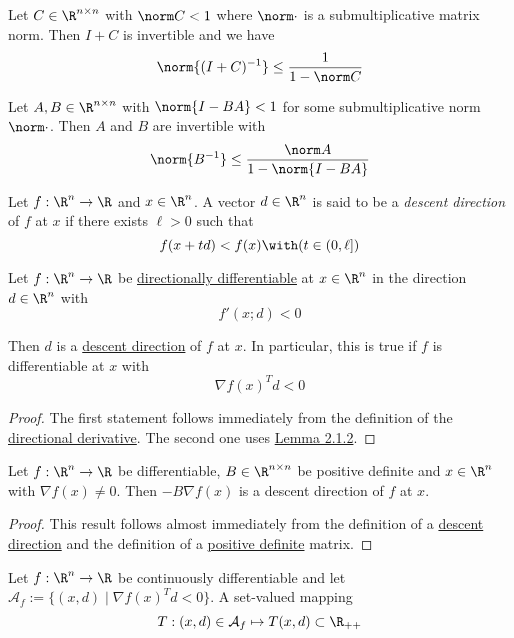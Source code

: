 \label{c733e75}

Let $C\in\R^{n\times n}$ with $\norm C<1$ where $\norm\cdot$ is a
submultiplicative matrix norm. Then $I+C$ is invertible and we have
$$
  \norm{(I+C)^{-1}}\leq\frac1{1-\norm C}
$$

\label{ae04fae}

Let $A,B\in\R^{n\times n}$ with $\norm{I-BA}<1$ for some submultiplicative norm
$\norm\cdot$. Then $A$ and $B$ are invertible with
$$
  \norm{B^{-1}}\leq\frac{\norm A}{1-\norm{I-BA}}
$$

\label{ac99a6d}

Let $f:\R^n\to\R$ and $x\in\R^n$. A vector $d\in\R^n$ is said to be a
\textit{descent direction} of $f$ at $x$ if there exists $\ell>0$ such that
$$
  f(x+td)<f(x)\with(t\in(0,\ell])
$$

\label{f81d53c}

Let $f:\R^n\to\R$ be \href{b7d1188}{directionally differentiable} at $x\in\R^n$
in the direction $d\in\R^n$ with
$$
  f'(x;d)<0
$$

Then $d$ is a \href{ac99a6d}{descent direction} of $f$ at $x$. In particular,
this is true if $f$ is differentiable at $x$ with
$$
  \nabla f(x)^Td<0
$$

\begin{proof}
  The first statement follows immediately from the definition of the
  \href{b7d1188}{directional derivative}. The second one uses
  \href{ed67d29}{Lemma 2.1.2}.
\end{proof}

\label{c41d0f0}

Let $f:\R^n\to\R$ be differentiable, $B\in\R^{n\times n}$ be positive definite
and $x\in\R^n$ with $\nabla f(x)\neq0$. Then $-B\nabla f(x)$ is a descent
direction of $f$ at $x$.

\begin{proof}
  This result follows almost immediately from the definition of a
  \href{ac99a6d}{descent direction} and the definition of a
  \href{e25e722}{positive definite} matrix.
\end{proof}

\label{ae4eac6}

Let $f:{\R}^n\to{\R}$ be continuously differentiable and let $\mathcal
A_f:=\{(x,d)\mid\nabla f(x)^Td<0\}$. A set-valued mapping
$$
  T:(x,d)\in\mathcal A_f\mapsto T(x,d)\subset\R_{++}
$$

